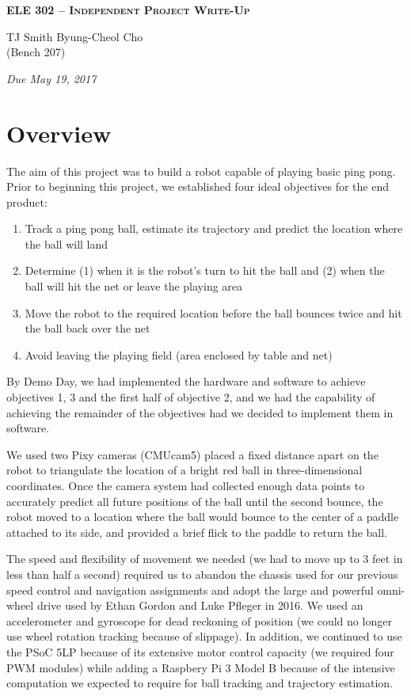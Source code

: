\documentclass[letterpaper, 11pt]{article}
\begin{document}
    \begin{center}
        \large
        \textsc{\textbf{ELE 302 -- Independent Project Write-Up}} \vspace{5pt}

        \normalsize
        TJ Smith \hspace{1cm} Byung-Cheol Cho \\
        (Bench 207) \vspace{5pt}

        \emph{Due May 19, 2017}
        \normalsize
    \end{center}

\section{Overview}
The aim of this project was to build a robot capable of playing basic ping pong. Prior to beginning this project, we established four ideal objectives for the end product:
\begin{enumerate}[label=\textbf{\arabic*.}]
    \item Track a ping pong ball, estimate its trajectory and predict the location where the ball will land
    \item Determine (1) when it is the robot's turn to hit the ball and (2) when the ball will hit the net or leave the playing area
    \item Move the robot to the required location before the ball bounces twice and hit the ball back over the net
    \item Avoid leaving the playing field (area enclosed by table and net)
\end{enumerate}
By Demo Day, we had implemented the hardware and software to achieve objectives 1, 3 and the first half of objective 2, and we had the capability of achieving the remainder of the objectives had we decided to implement them in software.

We used two Pixy cameras (CMUcam5) placed a fixed distance apart on the robot to triangulate the location of a bright red ball in three-dimensional coordinates. Once the camera system had collected enough data points to accurately predict all future positions of the ball until the second bounce, the robot moved to a location where the ball would bounce to the center of a paddle attached to its side, and provided a brief flick to the paddle to return the ball.

The speed and flexibility of movement we needed (we had to move up to 3 feet in less than half a second) required us to abandon the chassis used for our previous speed control and navigation assignments and adopt the large and powerful omni-wheel drive used by Ethan Gordon and Luke Pfleger in 2016. We used an accelerometer and gyroscope for dead reckoning of position (we could no longer use wheel rotation tracking because of slippage). In addition, we continued to use the PSoC 5LP because of its extensive motor control capacity (we required four PWM modules) while adding a Raspbery Pi 3 Model B because of the intensive computation we expected to require for ball tracking and trajectory estimation.
\end{document}

